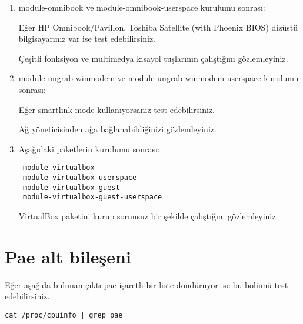 \documentclass[a4paper,10pt]{article}
\begin{document}
\begin{enumerate}
\item module-omnibook ve module-omnibook-userspace  kurulumu sonrası: 

Eğer HP Omnibook/Pavillon, Toshiba Satellite (with Phoenix BIOS) dizüstü bilgisayarınız var ise test edebilirsiniz. 

Çeşitli fonksiyon ve multimedya kısayol tuşlarının çalıştığını gözlemleyiniz.

\item module-ungrab-winmodem ve module-ungrab-winmodem-userspace kurulumu sonrası: 

Eğer smartlink mode kullanıyorsanız test edebilirsiniz.

Ağ yöneticisinden ağa bağlanabildiğinizi gözlemleyiniz.

\item  Aşağıdaki paketlerin kurulumu sonrası: 
\begin{verbatim}
 module-virtualbox
 module-virtualbox-userspace
 module-virtualbox-guest
 module-virtualbox-guest-userspace
\end{verbatim}

VirtualBox paketini kurup sorunsuz bir şekilde çalıştığını gözlemleyiniz.

\end{enumerate}

\section{Pae alt bileşeni}

Eğer aşağıda bulunan çıktı pae işaretli bir liste döndürüyor ise bu bölümü test edebilirsiniz.
\begin{verbatim}
cat /proc/cpuinfo | grep pae 
\end{verbatim}
\end{document}
